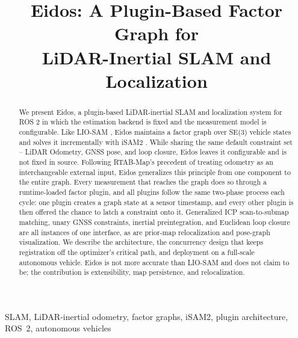 \documentclass[conference]{IEEEtran}
\title{Eidos: A Plugin-Based Factor Graph for\\LiDAR-Inertial SLAM and Localization}
\author{\IEEEauthorblockN{Brian Zheng, Lucas Reljic-Dumont, Eddy Zhou, Mohammad Al-Sharman}
\IEEEauthorblockA{
\textit{University of Waterloo} \\
Waterloo, Ontario, Canada \\
}}
\begin{document}
\maketitle

\begin{abstract}
We present Eidos, a plugin-based LiDAR-inertial SLAM and localization system for ROS 2 in which the estimation backend is fixed and the measurement model is configurable. Like LIO-SAM \parencite{shan2020liosam}, Eidos maintains a factor graph over SE(3) vehicle states and solves it incrementally with iSAM2 \parencite{kaess2012isam2}. While sharing the same default constraint set -- LiDAR Odometry, GNSS pose, and loop closure, Eidos leaves it configurable and is not fixed in source. Following RTAB-Map's \parencite{labbe2019rtabmap} precedent of treating odometry as an interchangeable external input, Eidos generalizes this principle from one component to the entire graph. Every measurement that reaches the graph does so through a runtime-loaded factor plugin, and all plugins follow the same two-phase process each cycle: one plugin creates a graph state at a sensor timestamp, and every other plugin is then offered the chance to latch a constraint onto it. Generalized ICP scan-to-submap matching, unary GNSS constraints, inertial preintegration, and Euclidean loop closure are all instances of one interface, as are prior-map relocalization and pose-graph visualization. We describe the architecture, the concurrency design that keeps registration off the optimizer's critical path, and deployment on a full-scale autonomous vehicle. Eidos is not more accurate than LIO-SAM and does not claim to be; the contribution is extensibility, map persistence, and relocalization.
\end{abstract}

\begin{IEEEkeywords}
SLAM, LiDAR-inertial odometry, factor graphs, iSAM2, plugin architecture, ROS~2, autonomous vehicles
\end{IEEEkeywords}
\end{document}
